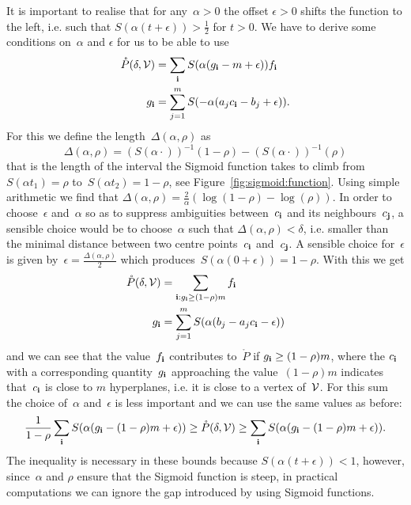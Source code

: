 %
It is important to realise that for any~$\alpha>0$ the offset $\epsilon>0$ shifts the function to the left, i.e. such that $S(\alpha(t+\epsilon))>\frac{1}{2}$ for $t>0$.
%
We have to derive some conditions on~$\alpha$ and $\epsilon$ for us to be able to use
%
\begin{equation}\begin{aligned}
	\mathring P(\delta,\mathcal V) &= \sum_{\mathbf{i}}S(\alpha(g_{\mathbf{i}}-m+\epsilon))f_{\mathbf{i}}\\
	g_{\mathbf{i}} &= \sum_{j=1}^m S(-\alpha(a_jc_{\mathbf{i}}-b_j+\epsilon)).
\end{aligned}\end{equation}
%
For this we define the length~$\Delta(\alpha,\rho)$ as
%
\begin{equation}
	\Delta(\alpha,\rho) = (S(\alpha \cdot))^{-1}(1-\rho)-(S(\alpha \cdot))^{-1}(\rho)
\end{equation}
%
that is the length of the interval the Sigmoid function takes to climb from~$S(\alpha t_1)=\rho$ to~$S(\alpha t_2)=1-\rho$, see Figure~\ref{fig:sigmoid:function}.
%
Using simple arithmetic we find that $\Delta(\alpha,\rho)=\frac{2}{\alpha}(\log(1-\rho)-\log(\rho))$.
%
In order to choose~$\epsilon$ and~$\alpha$ so as to suppress ambiguities between~$c_{\mathbf{i}}$ and its neighbours~$c_{\mathbf{j}}$, a sensible choice would be to choose~$\alpha$ such that $\Delta(\alpha,\rho)<\delta$, i.e. smaller than the minimal distance between two centre points~$c_{\mathbf{i}}$ and~$c_{\mathbf{j}}$.
%
A sensible choice for~$\epsilon$ is given by~$\epsilon=\frac{\Delta(\alpha,\rho)}{2}$ which produces~$S(\alpha(0+\epsilon))=1-\rho$.
%
With this we get
%
\begin{equation}\begin{aligned}
	\mathring P(\delta,\mathcal V) &= \sum_{\mathbf{i}:g_{\mathbf{i}}\geq(1-\rho)m}f_{\mathbf{i}}\\
	g_{\mathbf{i}} &=\sum_{j=1}^m S(\alpha(b_j-a_jc_{\mathbf{i}}-\epsilon))
\end{aligned}\end{equation}
%
and we can see that the value~$f_{\mathbf{i}}$ contributes to~$\mathring P$ if $g_{\mathbf{i}}\geq(1-\rho)m$, where the $c_{\mathbf{i}}$ with a corresponding quantity~$g_{\mathbf{i}}$ approaching the value~$(1-\rho)m$ indicates that~$c_{\mathbf{i}}$ is close to $m$ hyperplanes, i.e. it is close to a vertex of~$\mathcal V$.
%
For this sum the choice of~$\alpha$ and~$\epsilon$ is less important and we can use the same values as before:
%
\begin{equation}\label{eq:upper:and:lower:bound:as:if:we:needed:it}
	\frac{1}{1-\rho}\sum_{\mathbf{i}}S(\alpha(g_{\mathbf{i}}-(1-\rho)m+\epsilon))\geq \mathring P(\delta,\mathcal V) \geq \sum_{\mathbf{i}}S(\alpha(g_{\mathbf{i}}-(1-\rho)m+\epsilon)).
\end{equation}
%
The inequality is necessary in these bounds because $S(\alpha(t+\epsilon))<1$, however, since~$\alpha$ and $\rho$ ensure that the Sigmoid function is steep, in practical computations we can ignore the gap introduced by using Sigmoid functions.

